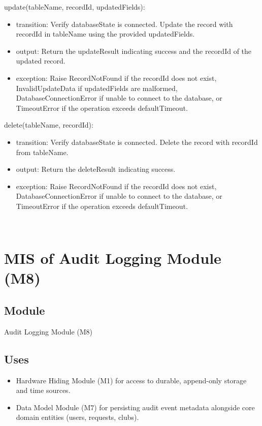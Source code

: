 \documentclass[12pt, titlepage]{article}
\begin{document}
\noindent update(tableName, recordId, updatedFields):
\begin{itemize}
  \item transition: Verify databaseState is connected. Update the record with recordId in tableName using the provided updatedFields.
  \item output: Return the updateResult indicating success and the recordId of the updated record.
  \item exception: Raise RecordNotFound if the recordId does not exist, InvalidUpdateData if updatedFields are malformed, DatabaseConnectionError if unable to connect to the database, or TimeoutError if the operation exceeds defaultTimeout.  
\end{itemize}

\noindent delete(tableName, recordId):
\begin{itemize}
  \item transition: Verify databaseState is connected. Delete the record with recordId from tableName.
  \item output: Return the deleteResult indicating success.
  \item exception: Raise RecordNotFound if the recordId does not exist, DatabaseConnectionError if unable to connect to the database, or TimeoutError if the operation exceeds defaultTimeout. 
\end{itemize}

~\newpage

\section{MIS of Audit Logging Module (M8)} \label{ModuleAuditLogging}

\subsection{Module}

Audit Logging Module (M8)

\subsection{Uses}

\begin{itemize}
  \item Hardware Hiding Module (M1) for access to durable, append-only storage and time sources.
  \item Data Model Module (M7) for persisting audit event metadata alongside core domain entities (users, requests, clubs).
\end{itemize}
\end{document}
